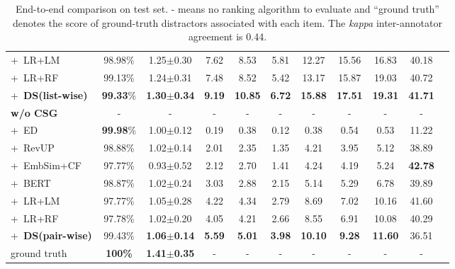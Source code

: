 \begin{table}[th]
\begin{tabular}{lc cc c c c c c cc}
			+~LR+LM &98.98\%  &1.25$\pm$0.30   &7.62  &8.53  &5.81 &12.27 &15.56 &16.83 &40.18 \\
			+~LR+RF &99.13\%  &1.24$\pm$0.31   &7.48 &8.52 &5.42 &13.17   &15.87 &19.03 &40.72\\
			+~\textbf{DS(list-wise)} &\textbf{99.33}\%  &\textbf{1.30$\pm$0.34} &\textbf{9.19}  &\textbf{10.85} &\textbf{6.72} &\textbf{15.88} &\textbf{17.51} &\textbf{19.31} &\textbf{41.71} \\
			\midrule
			\textbf{w/o CSG} &- &- &- &- &- &-  &- &- &- \\
			+~ED &\textbf{99.98}\%  &1.00$\pm$0.12  &0.19 &0.38  &0.12  &0.38  &0.54  &0.53  &11.22 \\
			+~RevUP &98.88\%  &1.02$\pm$0.14  &2.01 &2.35  &1.35  &4.21  &3.95  &5.12  &38.89 \\
			+~EmbSim+CF &97.77\%  &0.93$\pm$0.52  &2.12 &2.70  &1.41  &4.24  &4.19  &5.24  &\textbf{42.78} \\
			+~BERT &98.87\% &1.02$\pm$0.24  &3.03 &2.88  &2.15  &5.14  &5.29  &6.78  &39.89 \\
			+~LR+LM &97.77\%  &1.05$\pm$0.28   &4.22  &4.34  &2.79 &8.69 &7.02 &10.16 &41.60 \\
			+~LR+RF &97.78\%  &1.02$\pm$0.20   &4.05  &4.21 &2.66 &8.55 &6.91 &10.08 &40.29\\
			+~\textbf{DS(pair-wise)} &99.43\%  &\textbf{1.06$\pm$0.14} &\textbf{5.59} &\textbf{5.01} &\textbf{3.98} &\textbf{10.10}  &\textbf{9.28} &\textbf{11.60} &36.51\\
			\midrule
			ground truth &\textbf{100\%}  &\textbf{1.41$\pm$0.35}  & - & - & - & - & - & - & -\\
			\bottomrule
		\end{tabular}
		\caption{End-to-end comparison on test set. - means no ranking algorithm to evaluate and ``ground truth'' denotes the score of ground-truth distractors associated with each item. The \textit{kappa} inter-annotator agreement is 0.44.}
		\label{table:human}
	\end{table}

